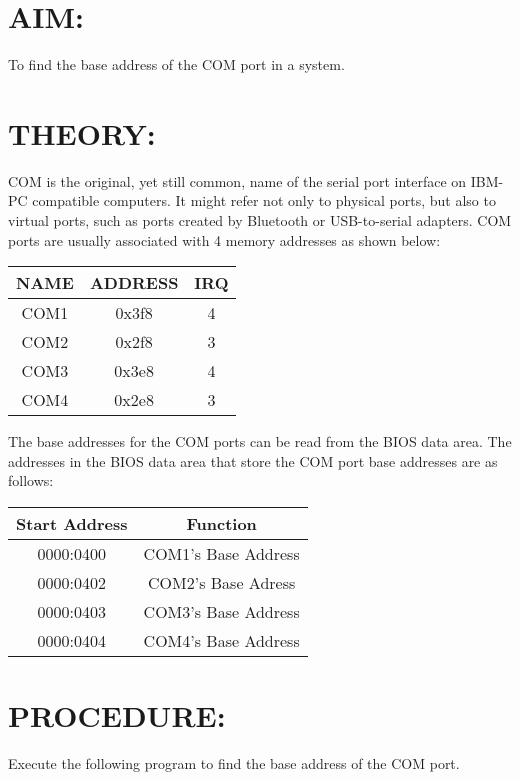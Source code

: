 
\section*{AIM:}
To find the base address of the COM port in a system.
\section*{THEORY:}
COM is the original, yet still common, name of the serial port interface on IBM-PC compatible computers. It might refer not only to physical ports, but also to virtual ports, such as ports created by Bluetooth or USB-to-serial adapters. COM ports are usually associated with 4 memory addresses as shown below:

\begin{center}
\bgroup
\def\arraystretch{1.5}
\begin{tabular}{ |c|c|c| }
\hline
\textbf{NAME} & \textbf{ADDRESS} & \textbf{IRQ}\\
\hline
COM1 & 0x3f8 & 4\\
\hline
COM2 & 0x2f8 & 3\\
\hline
COM3 & 0x3e8 & 4\\
\hline
COM4 & 0x2e8 & 3\\
\hline
\end{tabular}
\egroup
\end{center}

The base addresses for the COM ports can be read from the BIOS data area. The addresses in the BIOS data
area that store the COM port base addresses are as follows:

\begin{center}
\bgroup
\def\arraystretch{1.5}
\begin{tabular}{ |c|c| }
\hline
\textbf{Start Address} & \textbf{Function}\\
\hline
0000:0400 & COM1's Base Address\\
\hline
0000:0402 & COM2's Base Adress\\
\hline
0000:0403 & COM3's Base Address\\
\hline
0000:0404 & COM4's Base Address\\
\hline
\end{tabular}
\egroup
\end{center}

\section*{PROCEDURE:}
Execute the following program to find the base address of the COM port.

